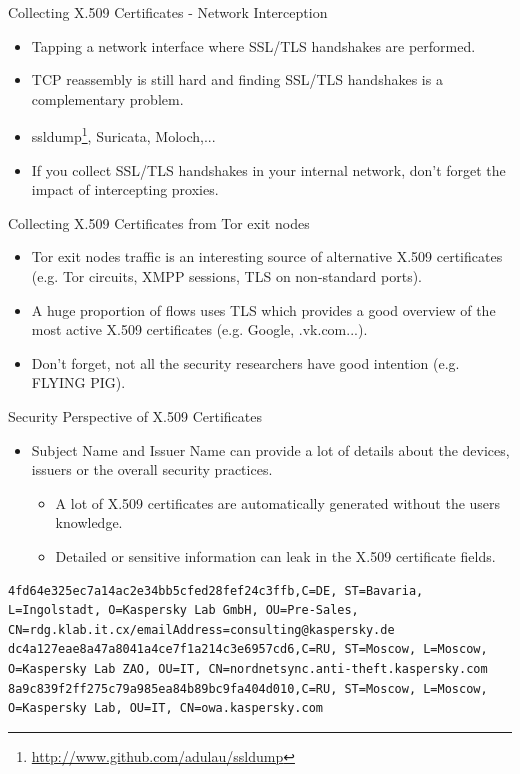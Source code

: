 \begin{frame}[t,fragile]{Collecting X.509 Certificates - Network Interception}
\begin{itemize}
        \item Tapping a network interface where SSL/TLS handshakes are performed.
        \item TCP reassembly is still hard and finding SSL/TLS handshakes is a complementary problem.
        \item ssldump\footnote{\url{http://www.github.com/adulau/ssldump}}, Suricata, Moloch,...
        \item If you collect SSL/TLS handshakes in your internal network, don't forget the impact of intercepting proxies.
\end{itemize}
\end{frame}

\begin{frame}[t,fragile]{Collecting X.509 Certificates from Tor exit nodes}
\begin{itemize}
        \item Tor exit nodes traffic is an interesting source of alternative X.509 certificates (e.g. Tor circuits, XMPP sessions, TLS on non-standard ports).
        \item A huge proportion of flows uses TLS which provides a good overview of the most active X.509 certificates (e.g. Google, .vk.com...).
        \item Don't forget, not all the security researchers have good intention (e.g. FLYING PIG).
\end{itemize}
\end{frame}

\begin{frame}[t,fragile]{Security Perspective of X.509 Certificates}
\begin{itemize}
        \item Subject Name and Issuer Name can provide a lot of details about the devices, issuers or the overall security practices.
        \begin{itemize}
                \item A lot of X.509 certificates are automatically generated without the users knowledge.
                \item Detailed or sensitive information can leak in the X.509 certificate fields.
        \end{itemize}
\end{itemize}
          \begin{lstlisting}[language=brol]
4fd64e325ec7a14ac2e34bb5cfed28fef24c3ffb,C=DE, ST=Bavaria, L=Ingolstadt, O=Kaspersky Lab GmbH, OU=Pre-Sales, CN=rdg.klab.it.cx/emailAddress=consulting@kaspersky.de
dc4a127eae8a47a8041a4ce7f1a214c3e6957cd6,C=RU, ST=Moscow, L=Moscow, O=Kaspersky Lab ZAO, OU=IT, CN=nordnetsync.anti-theft.kaspersky.com
8a9c839f2ff275c79a985ea84b89bc9fa404d010,C=RU, ST=Moscow, L=Moscow, O=Kaspersky Lab, OU=IT, CN=owa.kaspersky.com
          \end{lstlisting}
\end{frame}

